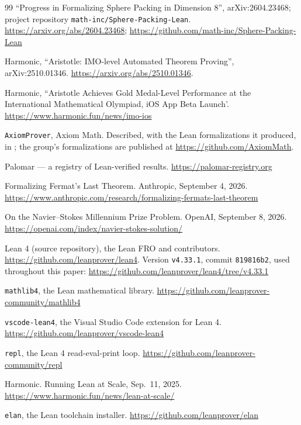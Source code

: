 \documentclass{article}
\begin{document}
\begin{thebibliography}{99}
 ``Progress in Formalizing Sphere Packing in Dimension 8'', arXiv:2604.23468; project repository \texttt{math-inc/Sphere-Packing-Lean}.
\url{https://arxiv.org/abs/2604.23468}; \url{https://github.com/math-inc/Sphere-Packing-Lean}

 Harmonic, ``Aristotle: IMO-level Automated Theorem Proving'', arXiv:2510.01346.
\url{https://arxiv.org/abs/2510.01346}.

 Harmonic, ``Aristotle Achieves Gold Medal-Level Performance at the International Mathematical Olympiad, iOS App Beta Launch'.
\url{https://www.harmonic.fun/news/imo-ios}

 \texttt{AxiomProver}, Axiom Math. Described, with the Lean formalizations it produced, in \cite{fel}; the group's formalizations are published at \url{https://github.com/AxiomMath}.

 Palomar --- a registry of Lean-verified results.
\url{https://palomar-registry.org}

Formalizing Fermat's Last Theorem. Anthropic, September 4, 2026.
\url{https://www.anthropic.com/research/formalizing-fermats-last-theorem}

On the Navier–Stokes Millennium Prize Problem. OpenAI, September 8, 2026.
\url{https://openai.com/index/navier-stokes-solution/}

 Lean 4 (source repository), the Lean FRO and contributors.
\url{https://github.com/leanprover/lean4}. Version \texttt{v4.33.1}, commit \texttt{819816b2}, used throughout this paper: \url{https://github.com/leanprover/lean4/tree/v4.33.1}

 \texttt{mathlib4}, the Lean mathematical library.
\url{https://github.com/leanprover-community/mathlib4}

 \texttt{vscode-lean4}, the Visual Studio Code extension for Lean 4.
\url{https://github.com/leanprover/vscode-lean4}

 \texttt{repl}, the Lean 4 read-eval-print loop.
\url{https://github.com/leanprover-community/repl}

 Harmonic. Running Lean at Scale, Sep.\ 11, 2025.
\url{https://www.harmonic.fun/news/lean-at-scale/}

 \texttt{elan}, the Lean toolchain installer.
\url{https://github.com/leanprover/elan}


\end{thebibliography}
\end{document}
